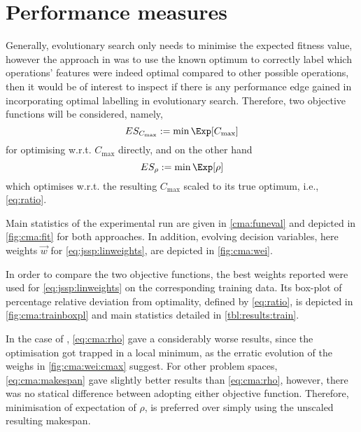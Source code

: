 \section{Performance measures}\label{sec:expr:measure}
Generally, evolutionary search only needs to minimise the expected fitness value, however the  approach in \cite{InRu11a} was to use the known optimum to correctly label which operations' features were indeed optimal compared to other possible operations, then it would be of interest to inspect if there is any performance edge gained in incorporating optimal labelling in evolutionary search. Therefore, two objective functions will be considered, namely, 
\begin{equation}
ES_{C_{\max}} := \min \Exp[C_{\max}] \label{eq:cma:makespan}
\end{equation}
for optimising w.r.t. $C_{\max}$ directly, and on the other hand
\begin{equation}
ES_{\rho} := \min \Exp[\rho] \label{eq:cma:rho}
\end{equation} 
which optimises w.r.t. the resulting $C_{\max}$ scaled to its true optimum, i.e., \cref{eq:ratio}.

Main statistics of the experimental run are given in \cref{cma:funeval} and depicted in \cref{fig:cma:fit} for both approaches. In addition, evolving decision variables, here weights $\vec{w}$ for \cref{eq:jssp:linweights}, are depicted in \cref{fig:cma:wei}. 

In order to compare the two objective functions, the best weights reported were used for \cref{eq:jssp:linweights} on the corresponding training data. Its box-plot of percentage relative deviation from optimality, defined by \cref{eq:ratio}, is depicted in \cref{fig:cma:trainboxpl} and main statistics detailed in \cref{tbl:results:train}. 

In the case of , \cref{eq:cma:rho}  gave a considerably worse results, since the optimisation got trapped in a local minimum, as the erratic evolution of the weighs in \cref{fig:cma:wei:cmax} suggest.
For other problem spaces, \cref{eq:cma:makespan} gave slightly better results than \cref{eq:cma:rho}, however, there was no statical difference between adopting either objective function. Therefore, minimisation of expectation of $\rho$, is preferred over simply using the unscaled resulting makespan. 

